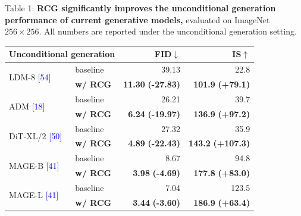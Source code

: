 \documentclass[10pt]{article}
\begin{document}
\graphicspath{{assets/}}
{\fontsize{10}{11}\selectfont Table 1: \textbf{RCG significantly improves the unconditional generation performance of current generative models,} evaluated on ImageNet $256\times256$. All numbers are reported under the unconditional generation setting.}\par\vspace{2pt}
\begin{center}\fontsize{8}{8.8}\selectfont\begin{tabular}{@{}llrr@{}}
\multicolumn{2}{l}{Unconditional generation} & FID$\downarrow$ & IS$\uparrow$\\\midrule
\multirow{2}{*}{LDM-8 \textcolor{blue}{[54]}} & baseline & 39.13 & 22.8 \\
 & \textbf{w/ RCG} & \textbf{11.30} {\textbf{\small\textcolor{green!70!black}{(-27.83)}}} & \textbf{101.9} {\textbf{\small\textcolor{green!70!black}{(+79.1)}}} \\
\midrule
\multirow{2}{*}{ADM \textcolor{blue}{[18]}} & baseline & 26.21 & 39.7 \\
 & \textbf{w/ RCG} & \textbf{6.24} {\textbf{\small\textcolor{green!70!black}{(-19.97)}}} & \textbf{136.9} {\textbf{\small\textcolor{green!70!black}{(+97.2)}}} \\
\midrule
\multirow{2}{*}{DiT-XL/2 \textcolor{blue}{[50]}} & baseline & 27.32 & 35.9 \\
 & \textbf{w/ RCG} & \textbf{4.89} {\textbf{\small\textcolor{green!70!black}{(-22.43)}}} & \textbf{143.2} {\textbf{\small\textcolor{green!70!black}{(+107.3)}}} \\
\midrule
\multirow{2}{*}{MAGE-B \textcolor{blue}{[41]}} & baseline & 8.67 & 94.8 \\
 & \textbf{w/ RCG} & \textbf{3.98} {\textbf{\small\textcolor{green!70!black}{(-4.69)}}} & \textbf{177.8} {\textbf{\small\textcolor{green!70!black}{(+83.0)}}} \\
\midrule
\multirow{2}{*}{MAGE-L \textcolor{blue}{[41]}} & baseline & 7.04 & 123.5 \\
 & \textbf{w/ RCG} & \textbf{3.44} {\textbf{\small\textcolor{green!70!black}{(-3.60)}}} & \textbf{186.9} {\textbf{\small\textcolor{green!70!black}{(+63.4)}}} \\
\end{tabular}\end{center}
\end{document}
